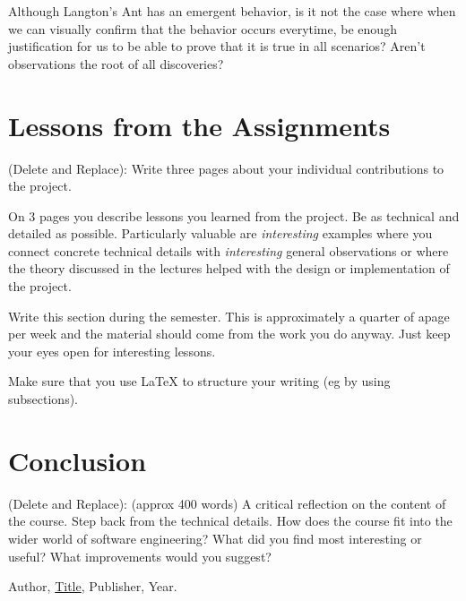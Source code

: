 \documentclass{article}
\theoremstyle{theorem}
\theoremstyle{definition}
\theoremstyle{remark}
\begin{document}
Although Langton's Ant has an emergent behavior, is it not the case where when we can visually confirm that the behavior occurs everytime, be enough justification for us to be able to prove that it is true in all scenarios? Aren't observations the root of all discoveries?

\section{Lessons from the Assignments}

(Delete and Replace): Write three pages about your individual contributions to the project.

On 3 pages you describe lessons you learned from the project. Be as technical and detailed as possible. Particularly valuable are \emph{interesting} examples where you connect concrete technical details with \emph{interesting} general observations or where the theory discussed in the lectures helped with the design or implementation of the project.

Write this section during the semester. This is approximately a quarter of apage per week and the material should come from the work you do anyway. Just keep your eyes open for interesting lessons.

Make sure that you use \LaTeX{} to structure your writing (eg by using subsections).

\section{Conclusion}\label{conclusion}

(Delete and Replace): (approx 400 words) A critical reflection on the content of the course. Step back from the technical details. How does the course fit into the wider world of software engineering? What did you find most interesting or useful? What improvements would you suggest?

\begin{thebibliography}{99}
 Author, \href{https://en.wikipedia.org/wiki/LaTeX}{Title}, Publisher, Year.
\end{thebibliography}
\end{document}
